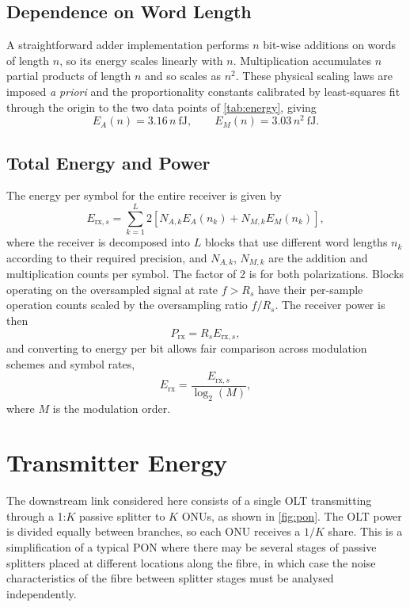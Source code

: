 \documentclass[12pt,a4paper]{article}
\begin{document}
\subsection{Dependence on Word Length}
A straightforward adder implementation performs \(n\) bit-wise additions on words of length \(n\), so its energy scales linearly with \(n\). Multiplication accumulates \(n\) partial products of length \(n\) and so scales as \(n^2\). These physical scaling laws are imposed \emph{a priori} and the proportionality constants calibrated by least-squares fit through the origin to the two data points of \cref{tab:energy}, giving
\begin{equation}
    E_A(n) = 3.16\,n \mathrm{\ fJ}, \qquad E_M(n) = 3.03\,n^2 \mathrm{\ fJ}.
\end{equation}

\subsection{Total Energy and Power}
The energy per symbol for the entire receiver is given by
\begin{equation}
    E_{\mathrm{rx},s} = \sum_{k=1}^{L} 2 \left[ N_{A,k}E_A(n_k) + N_{M,k}E_M(n_k) \right],
\end{equation}
where the receiver is decomposed into \(L\) blocks that use different word lengths \(n_k\) according to their required precision, and \(N_{A,k}\), \(N_{M,k}\) are the addition and multiplication counts per symbol. The factor of 2 is for both polarizations. Blocks operating on the oversampled signal at rate \(f > R_s\) have their per-sample operation counts scaled by the oversampling ratio \(f/R_s\). The receiver power is then
\begin{equation}
    P_\mathrm{rx} = R_s E_{\mathrm{rx},s},
\end{equation}
and converting to energy per bit allows fair comparison across modulation schemes and symbol rates,
\begin{equation}
    E_\mathrm{rx} = \frac{E_{\mathrm{rx},s}}{\log_2(M)},
    \label{eq:rx_energy}
\end{equation}
where \(M\) is the modulation order.

\section{Transmitter Energy}
The downstream link considered here consists of a single OLT transmitting through a 1:\(K\) passive splitter to \(K\) ONUs, as shown in \cref{fig:pon}. The OLT power is divided equally between branches, so each ONU receives a \(1/K\) share. This is a simplification of a typical PON where there may be several stages of passive splitters placed at different locations along the fibre, in which case the noise characteristics of the fibre between splitter stages must be analysed independently.
\end{document}
